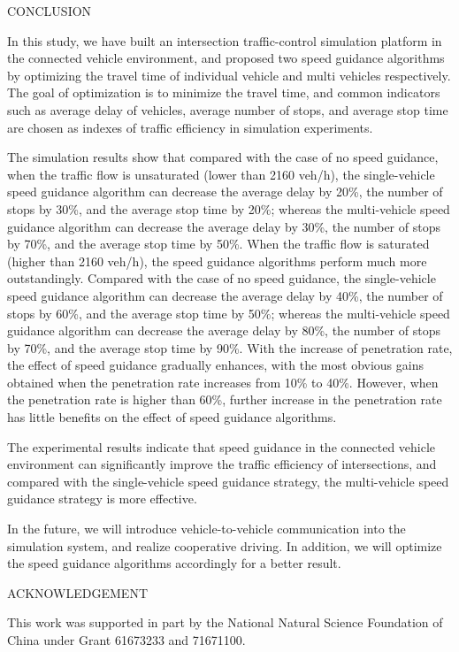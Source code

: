 CONCLUSION

In this study, we have built an intersection traffic-control simulation
platform in the connected vehicle environment, and proposed two speed
guidance algorithms by optimizing the travel time of individual vehicle
and multi vehicles respectively. The goal of optimization is to minimize
the travel time, and common indicators such as average delay of
vehicles, average number of stops, and average stop time are chosen as
indexes of traffic efficiency in simulation experiments.

The simulation results show that compared with the case of no speed
guidance, when the traffic flow is unsaturated (lower than 2160 veh/h),
the single-vehicle speed guidance algorithm can decrease the average
delay by 20\%, the number of stops by 30\%, and the average stop time by
20\%; whereas the multi-vehicle speed guidance algorithm can decrease
the average delay by 30\%, the number of stops by 70\%, and the average
stop time by 50\%. When the traffic flow is saturated (higher than 2160
veh/h), the speed guidance algorithms perform much more outstandingly.
Compared with the case of no speed guidance, the single-vehicle speed
guidance algorithm can decrease the average delay by 40\%, the number of
stops by 60\%, and the average stop time by 50\%; whereas the
multi-vehicle speed guidance algorithm can decrease the average delay by
80\%, the number of stops by 70\%, and the average stop time by 90\%.
With the increase of penetration rate, the effect of speed guidance
gradually enhances, with the most obvious gains obtained when the
penetration rate increases from 10\% to 40\%. However, when the
penetration rate is higher than 60\%, further increase in the
penetration rate has little benefits on the effect of speed guidance
algorithms.

The experimental results indicate that speed guidance in the connected
vehicle environment can significantly improve the traffic efficiency of
intersections, and compared with the single-vehicle speed guidance
strategy, the multi-vehicle speed guidance strategy is more effective.

In the future, we will introduce vehicle-to-vehicle communication into
the simulation system, and realize cooperative driving. In addition, we
will optimize the speed guidance algorithms accordingly for a better
result.

ACKNOWLEDGEMENT

This work was supported in part by the National Natural Science
Foundation of China under Grant 61673233 and 71671100.

